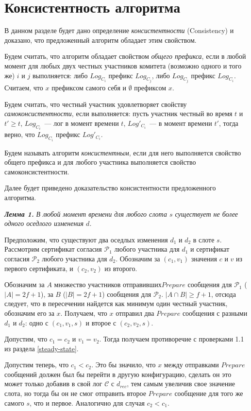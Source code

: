 \section{Консистентность алгоритма}
В данном разделе будет дано определение \textit{консистентности} (Consistency)\cite{hybrid-consensus} и доказано, что предложенный алгоритм обладает этим свойством.

Будем считать, что алгоритм обладает свойством \textit{общего префикса}, если в любой момент для любых двух честных участников комитета (возможно одного и того же) $i$ и $j$ выполняется: либо $Log_{C_i}$ префикс $Log_{C_j}$, либо $Log_{C_j}$ префикс $Log_{C_i}$. Считаем, что $x$ префиксом самого себя и $\emptyset$ префиксом $x$.

Будем считать, что честный участник удовлетворяет свойству \textit{самоконсистентности}, если выполняется: пусть участник честный во время $t$ и $t' \ge t$, $Log_{C_i}$~--- лог в момент времени $t$, $Log'_{C_i}$~--- в момент времени $t'$, тогда верно, что $Log_{C_i}$ префикс $Log'_{C_i}$.

Будем называть алгоритм \textit{консистентным}, если для него выполняется свойство общего префикса и для любого участника выполняется свойство самоконсистентности.
 
Далее будет приведено доказательство консистентности предложенного алгоритма.

\textbf{\textit{Лемма 1.}} \textit{В любой момент времени для любого слота $s$ существует не более одного оседлого изменения $d$.}

Предположим, что существуют два оседлых изменения $d_1$ и $d_2$ в слоте $s$. Рассмотрим сертификат согласия $\mathcal{P}_1$ любого участника для $d_1$ и сертификат согласия $\mathcal{P}_2$ любого участника для $d_2$. Обозначим за $(c_1, v_1)$ значения $c$ и $v$ из первого сертификата, и $(c_2, v_2)$ из второго.

Обозначим за $A$ множество участников отправивших$Prepare$ сообщения для  $\mathcal{P}_1$ ($|A|=2f+1$), за $B$ ($|B|=2f+1$) сообщения для $\mathcal{P}_2$. $|A \cap B| \ge f+1$, отсюда следует, что в пересечении найдется как минимум один честный участник,  обозначим его за $x$. Получаем, что $x$ отправил два $Prepare$ сообщения с разными $d_1$ и $d_2$: одно с $(c_1, v_1, s)$ и второе с $(c_2, v_2, s)$.

Допустим, что $c_1 = c_2$ и  $v_1 = v_2$. Тогда получаем противоречие с проверками 1.1 из раздела \ref{steady-state}.

Допустим теперь, что $c_1 < c_2$. Это бы значило, что $x$ между отправками $Prepare$ сообщений должен был бы перейти в другую конфигурацию, сделать он это может только добавив в свой лог $\mathcal{C}$ с $d_{rec}$, тем самым увеличив свое значение слота, но тогда бы он не смог отправить второе $Prepare$ сообщение для того же самого $s$, что и первое. Аналогично для случая $c_2 < c_1$.


